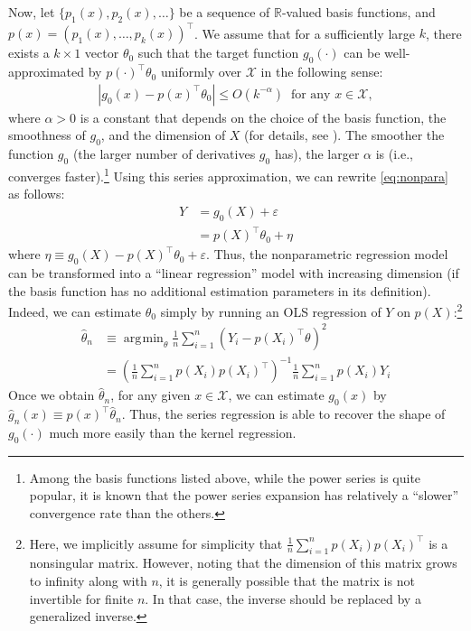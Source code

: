 \documentclass[10.5pt, A4paper, openany, uplatex]{book}
\newcommand{\mcl}{\mathcal}
\newcommand{\eps}{\varepsilon}
\renewcommand{\hat}{\widehat}
\numberwithin{equation}{section}
\DeclareMathOperator*{\argmin}{\arg\!\min}
\begin{document}
Now, let $\{p_1(x), p_2(x), \ldots \}$ be a sequence of $\mathbb{R}$-valued basis functions, and $p(x) = (p_1(x), \ldots , p_k(x))^\top$.
We assume that for a sufficiently large $k$, there exists a $k \times 1$ vector $\theta_0$ such that the target function $g_0(\cdot)$ can be well-approximated by $p(\cdot)^\top\theta_0$ uniformly over $\mcl{X}$ in the following sense:
\begin{align*}
	|g_0(x) - p(x)^\top\theta_0 | \le O(k^{-\alpha}) \;\; \text{for any $x \in \mcl{X}$},
\end{align*}
where $\alpha > 0$ is a constant that depends on the choice of the basis function, the smoothness of $g_0$, and the dimension of $X$ (for details, see \cite{chen2007large}).
The smoother the function $g_0$ (the larger number of derivatives $g_0$ has), the larger $\alpha$ is (i.e., converges faster).\footnote{
	Among the basis functions listed above, while the power series is quite popular, it is known that the power series expansion has relatively a ``slower'' convergence rate than the others.
}
Using this series approximation, we can rewrite \eqref{eq:nonpara} as follows:
\begin{align*}
	Y
	& = g_0(X) + \eps\\
	& = p(X)^\top\theta_0 + \eta
\end{align*}
where $\eta \equiv g_0(X) - p(X)^\top\theta_0 + \eps$.
Thus, the nonparametric regression model can be transformed into a ``linear regression'' model with increasing dimension (if the basis function has no additional estimation parameters in its definition).
Indeed, we can estimate $\theta_0$ simply by running an OLS regression of $Y$ on $p(X)$:\footnote{
	Here, we implicitly assume for simplicity that $\frac{1}{n}\sum_{i = 1}^n p(X_i)p(X_i)^\top$ is a nonsingular matrix.
	However, noting that the dimension of this matrix grows to infinity along with $n$, it is generally possible that the matrix is not invertible for finite $n$.
	In that case, the inverse should be replaced by a generalized inverse.
	}
\begin{align*}
	\hat \theta_n 
	& \equiv \argmin_\theta \frac{1}{n}\sum_{i = 1}^n (Y_i -  p(X_i)^\top\theta)^2 \\
	& = \left(\frac{1}{n}\sum_{i = 1}^n p(X_i)p(X_i)^\top\right)^{-1}\frac{1}{n}\sum_{i = 1}^n p(X_i)Y_i
\end{align*}
Once we obtain $\hat \theta_n$, for any given $x \in \mcl{X}$, we can estimate $g_0(x)$ by $\hat g_n(x)  \equiv p(x)^\top \hat \theta_n$.
Thus, the series regression is able to recover the shape of $g_0(\cdot)$ much more easily than the kernel regression.
\end{document}
